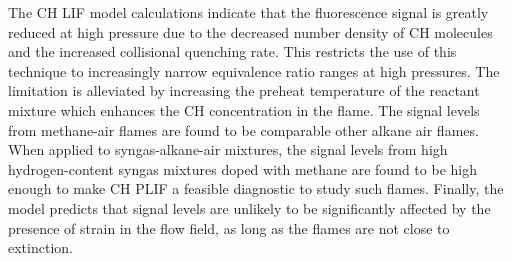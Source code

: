 The CH LIF model calculations indicate that the fluorescence signal is greatly reduced at high pressure due to the decreased number density of CH molecules and the increased collisional quenching rate.
This restricts the use of this technique to increasingly narrow equivalence ratio ranges at high pressures.
The limitation is alleviated by increasing the preheat temperature of the reactant mixture which enhances the CH concentration in the flame.
The signal levels from methane-air flames are found to be comparable other alkane air flames.
When applied to syngas-alkane-air mixtures, the signal levels from high hydrogen-content syngas mixtures doped with methane are found to be high enough to make CH PLIF a feasible diagnostic to study such flames.
Finally, the model predicts that signal levels are unlikely to be significantly affected by the presence of strain in the flow field, as long as the flames are not close to extinction.


